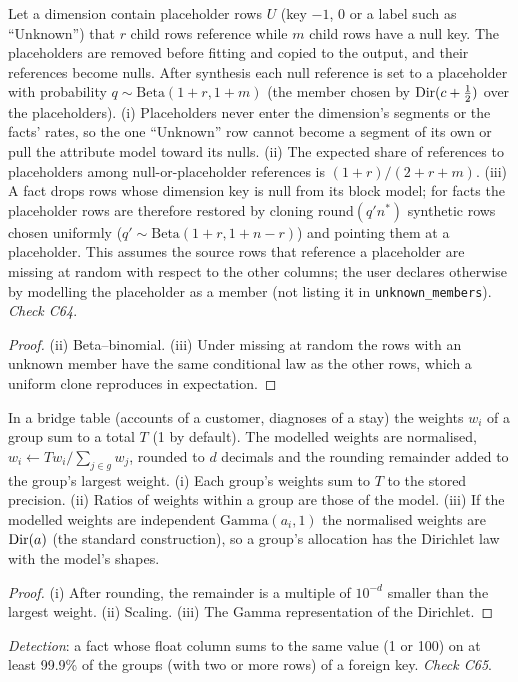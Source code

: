 \begin{proposition}\label{prop:unknown}
Let a dimension contain placeholder rows $U$ (key $-1$, 0 or a label such as ``Unknown'') that $r$ child rows reference while $m$ child rows have a null key. The placeholders are removed before fitting and copied to the output, and their references become nulls. After synthesis each null reference is set to a placeholder with probability $q\sim\mathrm{Beta}(1+r,1+m)$ (the member chosen by $\operatorname{Dir}(c+\frac12)$ over the placeholders). (i) Placeholders never enter the dimension's segments or the facts' rates, so the one ``Unknown'' row cannot become a segment of its own or pull the attribute model toward its nulls. (ii) The expected share of references to placeholders among null-or-placeholder references is $(1+r)/(2+r+m)$. (iii) A fact drops rows whose dimension key is null from its block model; for facts the placeholder rows are therefore restored by cloning $\mathrm{round}(q'n^*)$ synthetic rows chosen uniformly ($q'\sim\mathrm{Beta}(1+r,1+n-r)$) and pointing them at a placeholder. This assumes the source rows that reference a placeholder are missing at random with respect to the other columns; the user declares otherwise by modelling the placeholder as a member (not listing it in \texttt{unknown\_members}). \emph{Check C64}.
\end{proposition}
\begin{proof}
(ii) Beta--binomial. (iii) Under missing at random the rows with an unknown member have the same conditional law as the other rows, which a uniform clone reproduces in expectation.
\end{proof}

\begin{proposition}\label{prop:bridge}
In a bridge table (accounts of a customer, diagnoses of a stay) the weights $w_i$ of a group sum to a total $T$ (1 by default). The modelled weights are normalised, $w_i\leftarrow Tw_i/\sum_{j\in g}w_j$, rounded to $d$ decimals and the rounding remainder added to the group's largest weight. (i) Each group's weights sum to $T$ to the stored precision. (ii) Ratios of weights within a group are those of the model. (iii) If the modelled weights are independent $\mathrm{Gamma}(a_i,1)$ the normalised weights are $\operatorname{Dir}(a)$ (the standard construction), so a group's allocation has the Dirichlet law with the model's shapes.
\end{proposition}
\begin{proof}
(i) After rounding, the remainder is a multiple of $10^{-d}$ smaller than the largest weight. (ii) Scaling. (iii) The Gamma representation of the Dirichlet.
\end{proof}
\noindent \emph{Detection}: a fact whose float column sums to the same value (1 or 100) on at least 99.9\% of the groups (with two or more rows) of a foreign key. \emph{Check C65}.


